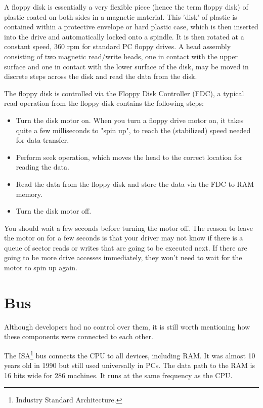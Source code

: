 \documentclass[book.tex]{subfiles}
\begin{document}
A floppy disk is essentially a very flexible piece (hence the term floppy disk) of plastic coated on both sides in a magnetic material. This 'disk' of plastic is contained within a protective envelope or hard plastic case, which is then inserted into the drive and automatically locked onto a spindle. It is then rotated at a constant speed, 360 rpm for standard PC floppy drives. A head assembly consisting of two magnetic read/write heads, one in contact with the upper surface and one in contact with the lower surface of the disk, may be moved in discrete steps across the disk and read the data from the disk.\\
\par
The floppy disk is controlled via the Floppy Disk Controller (FDC), a typical read operation from the floppy disk contains the following steps:
\begin{itemize}
  \item Turn the disk motor on. When you turn a floppy drive motor on, it takes quite a few milliseconds to "spin up", to reach the (stabilized) speed needed for data transfer.
  \item Perform seek operation, which moves the head to the correct location for reading the data.
  \item Read the data from the floppy disk and store the data via the FDC to RAM memory.
  \item Turn the disk motor off. 
\end{itemize}

You should wait a few seconds before turning the motor off. The reason to leave the motor on for a few seconds is that your driver may not know if there is a queue of sector reads or writes that are going to be executed next. If there are going to be more drive accesses immediately, they won't need to wait for the motor to spin up again.\\




\section{Bus}
Although developers had no control over them, it is still worth mentioning how these components were connected to each other.\\ 
\par

The ISA\footnote{Industry Standard Architecture.} bus connects the CPU to all devices, including RAM. It was almost 10 years old in 1990 but still used universally in PCs. The data path to the RAM is 16 bits wide for 286 machines. It runs at the same frequency as the CPU.\\
\par
\end{document}
